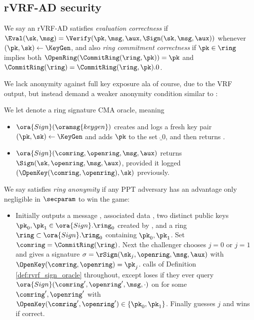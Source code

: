 
\subsection{rVRF-AD security}
\label{sec:rvrf_games}


\begin{definition}
We say an rVRF-AD satisfies {\em evaluation correctness} if
$\Eval(\sk,\msg) = \Verify(\pk,\msg,\aux,\Sign(\sk,\msg,\aux))$ %
whenever $(\pk,\sk) \leftarrow \KeyGen$, and
also {\em ring commitment correctness} if
$\pk \in \ring$ implies both $\OpenRing(\CommitRing(\ring,\pk)) = \pk$
and $\CommitRing(\ring) = \CommitRing(\ring,\pk).0$.
\end{definition}

We lack anonymity against full key exposure ala
 \cite[pp. 6 Def. 4]{cryptoeprint:2005:304} of course, due to the VRF output,
but instead demand a weaker anonymity condition similar to
 \cite[pp. 5 Def. 3]{cryptoeprint:2005:304}:

\begin{definition}\label{def:rvrf_sign_oracle}
We let  denote a ring signature CMA oracle, meaning
\begin{itemize}
\item $\ora{Sign}(\oramsg{keygen})$ creates and logs a fresh key pair
 $(\pk,\sk) \leftarrow \KeyGen$ and adds $\pk$ to the set $\ring_0$, and then returns \pk.
\item $\ora{Sign}(\comring,\openring,\msg,\aux)$ returns
 $\Sign(\sk,\openring,\msg,\aux)$, provided it logged $(\OpenKey(\comring,\openring),\sk)$ previously.
\end{itemize}
\end{definition}

\begin{definition}
We say \rVRF satisfies {\em ring anonymity} if
any PPT adversary \adv has an advantage only
 negligible in $\secparam$ to win the game:
\begin{itemize}
\item[]
 Initially \adv outputs a message \msg, associated data \aux,
 two distinct public keys $\pk_0,\pk_1 \in \ora{Sign}.\ring_0$ created by ,
 and a ring $\ring \subset \ora{Sign}.\ring_0$ containing $\pk_0,\pk_1$.
 Set $\comring = \CommitRing(\ring)$.
 Next the challenger chooses $j=0$ or $j=1$ and gives
  \adv a signature $\sigma = \rSign(\sk_j,\openring,\msg,\aux)$ with $\OpenKey(\comring,\openring) = \pk_j$.
 \adv calls  of Definition \ref{def:rvrf_sign_oracle} throughout,
 except \adv loses if they ever query $\ora{Sign}(\comring',\openring',\msg,\cdot)$
 on \msg for some $\comring',\openring'$ with $\OpenKey(\comring',\openring') \in \{ \pk_0, \pk_1 \}$.
 Finally \adv guesses $j$ and wins if correct.
\end{itemize}
\end{definition}

